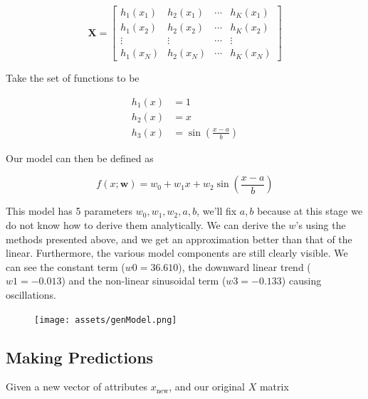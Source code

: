 		$$\mathbf{X}=\left[\begin{array}{cccc}h_{1}\left(x_{1}\right) & h_{2}\left(x_{1}\right) & \cdots & h_{K}\left(x_{1}\right) \\ h_{1}\left(x_{2}\right) & h_{2}\left(x_{2}\right) & \cdots & h_{K}\left(x_{2}\right) \\ \vdots & \vdots & \cdots & \vdots \\ h_{1}\left(x_{N}\right) & h_{2}\left(x_{N}\right) & \cdots & h_{K}\left(x_{N}\right)\end{array}\right]$$

		\par{Take the set of functions to be}

		$$\begin{aligned} h_{1}(x) &=1 \\ h_{2}(x) &=x \\ h_{3}(x) &=\sin \left(\frac{x-a}{b}\right)  \end{aligned}$$

		\par{Our model can then be defined as}

		$$f(x ; \mathbf{w}) =w_{0}+w_{1} x+w_{2} \sin \left(\frac{x-a}{b}\right)$$

		\par{This model has 5 parameters $w_{0}, w_{1}, w_{2}, a, b$, we'll fix $a,b$ because at this stage we do not know how to derive them analytically. We can derive the $w$'s using the methods presented above, and we get an approximation better than that of the linear. Furthermore, the various model components are still clearly visible. We can see the constant term ($w0 = 36.610$), the downward linear trend ($w1 = -0.013$) and the non-linear sinusoidal term ($w3 = -0.133$) causing oscillations.}

		\begin{figure}[H]
		\centering
		\texttt{[image: assets/genModel.png]}
		\end{figure}



		\subsection{Making Predictions}

		\par{Given a new vector of attributes $x_{\text{new}}$, and our original $X$ matrix}

